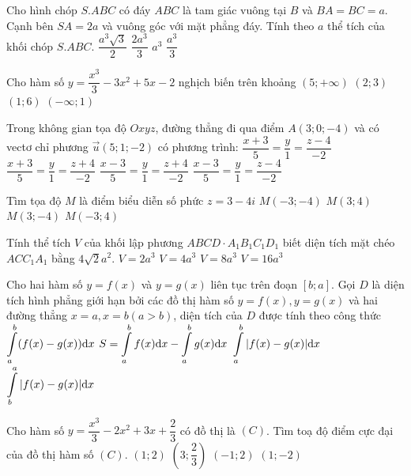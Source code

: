 \begin{ex}%
Cho hình chóp $S.ABC$ có đáy $ABC$ là tam giác vuông tại $B$ và $BA=BC=a$. Cạnh bên $SA=2 a$ và vuông góc với mặt phẳng đáy. Tính theo $a$ thể tích của khối chóp $S.ABC$.
\choice
{$\dfrac{a^3 \sqrt{3}}{2}$}
{$\dfrac{2 a^3}{3}$}
{$a^3$}
{\True $\dfrac{a^3}{3}$}

\end{ex}
\begin{ex}%
Cho hàm số $y=\dfrac{x^3}{3}-3 x^2+5 x-2$ nghịch biến trên khoảng
\choice
{$(5;+\infty)$}
{\True $(2; 3)$}
{$(1; 6)$}
{$(-\infty; 1)$}

\end{ex}
\begin{ex}%
Trong không gian tọa độ $O x y z$, đường thẳng đi qua điểm $A(3; 0;-4)$ và có vectơ chỉ phương $\vec{u}(5; 1;-2)$ có phương trình:
\choice
{$\dfrac{x+3}{5}=\dfrac{y}{1}=\dfrac{z-4}{-2}$}
{$\dfrac{x+3}{5}=\dfrac{y}{1}=\dfrac{z+4}{-2}$}
{\True $\dfrac{x-3}{5}=\dfrac{y}{1}=\dfrac{z+4}{-2}$}
{$\dfrac{x-3}{5}=\dfrac{y}{1}=\dfrac{z-4}{-2}$}

\end{ex}
\begin{ex}%
Tìm tọa độ $M$ là điểm biểu diễn số phức $z=3-4 i$ 
\choice
{$M(-3;-4)$}
{$M(3; 4)$}
{\True $M(3;-4)$}
{$M(-3; 4)$}

\end{ex}
\begin{ex}%
Tính thể tích $V$ của khối lập phương $ABCD \cdot A_1 B_1 C_1 D_1$ biết diện tích mặt chéo $ACC_1 A_1$ bằng $4\sqrt{2} a^2$.
\choice
{$V=2 a^3$}
{$V=4 a^3$}
{\True $V=8 a^3$}
{$V=16 a^3$}

\end{ex}
\begin{ex}%
Cho hai hàm số $y=f(x)$ và $y=g(x)$ liên tục trên đoạn $[b; a]$. Gọi $D$ là diện tích hình phẳng giới hạn bởi các đồ thị hàm số $y=f(x), y=g(x)$ và hai đường thẳng $x=a, x=b(a>b)$, diện tích của $D$ được tính theo công thức
\choice
{$\displaystyle\displaystyle\int\limits_a^{b}(f(x)-g(x)) \mathrm{d} x$}
{$S=\displaystyle\displaystyle\int\limits_a^{b} f(x) \mathrm{d} x-\displaystyle\displaystyle\int\limits_a^{b} g(x) \mathrm{d} x$}
{$\displaystyle\displaystyle\int\limits_a^{b}|f(x)-g(x)| \mathrm{d} x$}
{\True $\displaystyle\displaystyle\int\limits_b^{a}|f(x)-g(x)| \mathrm{d} x$}

\end{ex}
\begin{ex}%
Cho hàm số $y=\dfrac{x^3}{3}-2 x^2+3 x+\dfrac{2}{3}$ có đồ thị là $(C)$. Tìm toạ độ điểm cực đại của đồ thị hàm số $(C)$.
\choice
{\True $(1; 2)$}
{$\left(3; \dfrac{2}{3}\right)$}
{$(-1; 2)$}
{$(1;-2)$}

\end{ex}

